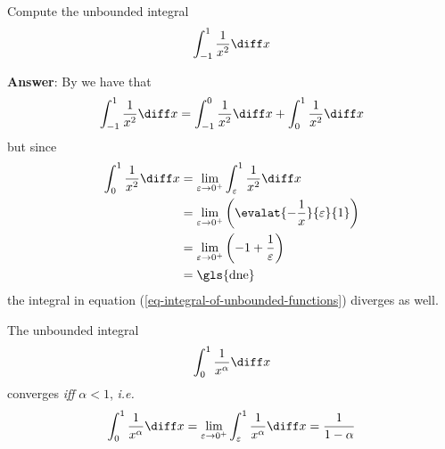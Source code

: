 \begin{exm}\label{exm-integral-of-unbounded-functions:1}
	Compute the unbounded integral
	\begin{equation*}
		\int_{-1}^1 \frac{1}{x^2} \diff x
	\end{equation*}
	\begin{flushleft}
		\textbf{Answer}: By  we have that
		\begin{equation}\label{eq-integral-of-unbounded-functions}
			\int_{-1}^1 \frac{1}{x^2} \diff x = \int_{-1}^0 \frac{1}{x^2} \diff x + \int_0^1 \frac{1}{x^2} \diff x
		\end{equation}
		but since
		\begin{align*}
			\int_0^1 \frac{1}{x^2} \diff x
			 & = \lim_{\varepsilon\to0^+} \int_\varepsilon^1 \frac{1}{x^2} \diff x           \\
			 & = \lim_{\varepsilon\to0^+} \left(\evalat{-\frac{1}{x}}{\varepsilon}{1}\right) \\
			 & = \lim_{\varepsilon\to0^+} \left(-1+\frac{1}{\varepsilon}\right)              \\
			 & = \text{\gls{dne}}
		\end{align*}
		the integral in equation (\ref{eq-integral-of-unbounded-functions}) diverges as well.
	\end{flushleft}
\end{exm}

\begin{thm}\label{thm-geometric-unbounded-integral}
	The unbounded integral
	\begin{equation*}
		\int_0^1 \frac{1}{x^\alpha} \diff x
	\end{equation*}
	converges \textit{iff} $\alpha<1$, \textit{i.e.}
	\begin{equation}\label{eq-geometric-improper-integral:2}
		\int_0^1 \frac{1}{x^\alpha} \diff x = \lim_{\varepsilon\to0^+} \int_\varepsilon^1 \frac{1}{x^\alpha} \diff x = \frac{1}{1-\alpha}
	\end{equation}
\end{thm}

